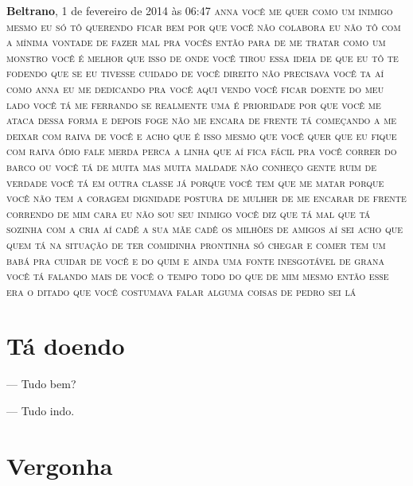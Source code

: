 {\textbf{Beltrano}, 1 de fevereiro de 2014 às 06:47 \textsc{anna você me
quer como um inimigo mesmo eu só tô querendo ficar bem por que você não
colabora eu não tô com a mínima vontade de fazer mal pra vocês então
para de me tratar como um monstro você é melhor que isso de onde você
tirou essa ideia de que eu tô te fodendo que se eu tivesse cuidado de você
direito não precisava você ta aí como anna eu me dedicando pra você aqui
vendo você ficar doente do meu lado você tá me ferrando se realmente uma
é prioridade por que você me ataca dessa forma e depois foge não me
encara de frente tá começando a me deixar com raiva de você e acho que é
isso mesmo que você quer que eu fique com raiva ódio fale merda perca a
linha que aí fica fácil pra você correr do barco ou você tá de muita mas
muita maldade não conheço gente ruim de verdade você tá em outra classe
já porque você tem que me matar porque você não tem a coragem dignidade
postura de mulher de me encarar de frente correndo de mim cara eu não
sou seu inimigo você diz que tá mal que tá sozinha com a cria aí cadê a
sua mãe cadê os milhões de amigos aí sei acho que quem tá na situação de
ter comidinha prontinha só chegar e comer tem um babá pra cuidar de você
e do quim e ainda uma fonte inesgotável de grana você tá falando mais de
você o tempo todo do que de mim mesmo então esse era o ditado que você
costumava falar alguma coisas de pedro sei lá}


\chapter{Tá doendo}\label{tuxe1-doendo}

--- Tudo bem?

--- Tudo indo.}


\chapter{Vergonha}\label{vergonha}

